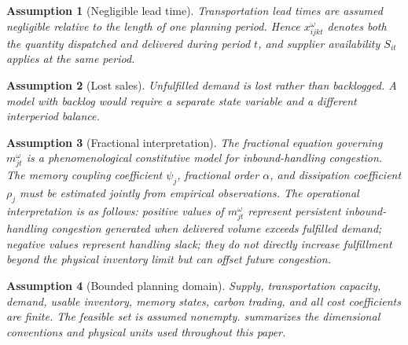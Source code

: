 \documentclass[11pt,a4paper]{article}
\newtheorem{assumption}{Assumption}
\begin{document}
\begin{assumption}[Negligible lead time]
\label{ass:leadtime}
Transportation lead times are assumed negligible relative to the length
of one planning period. Hence \(x_{ijkt}^{\omega}\) denotes both the
quantity dispatched and delivered during period \(t\), and supplier
availability \(S_{it}\) applies at the same period.
\end{assumption}

\begin{assumption}[Lost sales]
\label{ass:lostsales}
Unfulfilled demand is lost rather than backlogged. A model with backlog
would require a separate state variable and a different interperiod balance.
\end{assumption}

\begin{assumption}[Fractional interpretation]
\label{ass:fractional}
The fractional equation governing \(m_{jt}^{\omega}\) is a phenomenological
constitutive model for inbound-handling congestion. The memory coupling
coefficient \(\psi_j\), fractional order \(\alpha\), and dissipation
coefficient \(\rho_j\) must be estimated jointly from empirical
observations. The operational interpretation is as follows: positive
values of \(m_{jt}^{\omega}\) represent persistent inbound-handling
congestion generated when delivered volume exceeds fulfilled demand;
negative values represent handling slack; they do not directly
increase fulfillment beyond the physical inventory limit but can offset
future congestion.
\end{assumption}

\begin{assumption}[Bounded planning domain]
\label{ass:bounds}
Supply, transportation capacity, demand, usable inventory, memory states,
carbon trading, and all cost coefficients are finite. The feasible set is
assumed nonempty.  summarizes the dimensional
conventions and physical units used throughout this paper.
\end{assumption}
\end{document}
